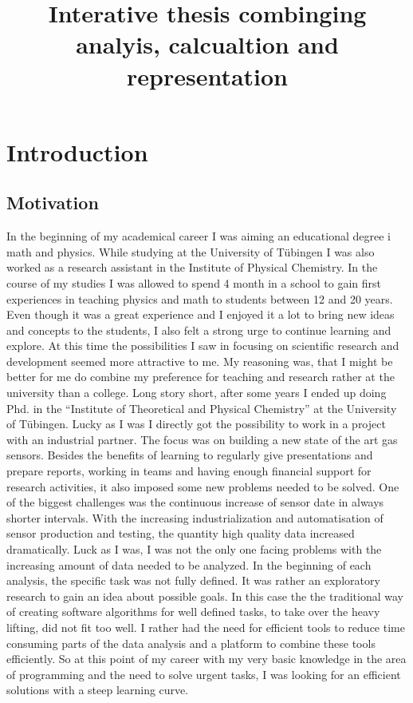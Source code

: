 \documentclass[11pt]{article}
\title{Interative thesis combinging analyis, calcualtion and representation}
\begin{document}
    
    \maketitle
    
    

    
    \tableofcontents 
\setcounter{section}{0}

    \hypertarget{introduction}{%
\section{Introduction}\label{introduction}}

\hypertarget{motivation}{%
\subsection{Motivation}\label{motivation}}

In the beginning of my academical career I was aiming an educational
degree i math and physics. While studying at the University of Tübingen
I was also worked as a research assistant in the Institute of Physical
Chemistry. In the course of my studies I was allowed to spend 4 month in
a school to gain first experiences in teaching physics and math to
students between 12 and 20 years. Even though it was a great experience
and I enjoyed it a lot to bring new ideas and concepts to the students,
I also felt a strong urge to continue learning and explore. At this time
the possibilities I saw in focusing on scientific research and
development seemed more attractive to me. My reasoning was, that I might
be better for me do combine my preference for teaching and research
rather at the university than a college. Long story short, after some
years I ended up doing Phd. in the ``Institute of Theoretical and
Physical Chemistry'' at the University of Tübingen. Lucky as I was I
directly got the possibility to work in a project with an industrial
partner. The focus was on building a new state of the art gas sensors.
Besides the benefits of learning to regularly give presentations and
prepare reports, working in teams and having enough financial support
for research activities, it also imposed some new problems needed to be
solved. One of the biggest challenges was the continuous increase of
sensor date in always shorter intervals. With the increasing
industrialization and automatisation of sensor production and testing,
the quantity high quality data increased dramatically. Luck as I was, I
was not the only one facing problems with the increasing amount of data
needed to be analyzed. In the beginning of each analysis, the specific
task was not fully defined. It was rather an exploratory research to
gain an idea about possible goals. In this case the the traditional way
of creating software algorithms for well defined tasks, to take over the
heavy lifting, did not fit too well. I rather had the need for efficient
tools to reduce time consuming parts of the data analysis and a platform
to combine these tools efficiently. So at this point of my career with
my very basic knowledge in the area of programming and the need to solve
urgent tasks, I was looking for an efficient solutions with a steep
learning curve.
\end{document}
